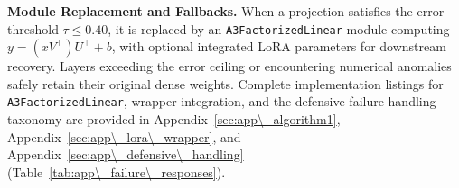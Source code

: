 \textbf{Module Replacement and Fallbacks.} When a projection satisfies the error threshold $\tau \le 0.40$, it is replaced by an \texttt{A3FactorizedLinear} module computing $y = (x V^\top) U^\top + b$, with optional integrated LoRA parameters for downstream recovery. Layers exceeding the error ceiling or encountering numerical anomalies safely retain their original dense weights. Complete implementation listings for \texttt{A3FactorizedLinear}, wrapper integration, and the defensive failure handling taxonomy are provided in Appendix~\ref{sec:app\_algorithm1}, Appendix~\ref{sec:app\_lora\_wrapper}, and Appendix~\ref{sec:app\_defensive\_handling} (Table~\ref{tab:app\_failure\_responses}).